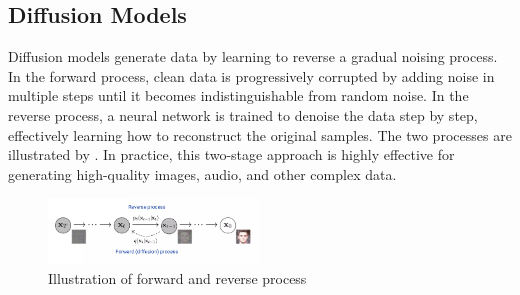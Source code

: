 \documentclass[a4paper,10pt]{article}
\begin{document}
\subsection{Diffusion Models}
Diffusion models generate data by learning to reverse a gradual noising process. In the forward process, clean data is progressively corrupted by adding noise in multiple steps until it becomes indistinguishable from random noise. In the reverse process, a neural network is trained to denoise the data step by step, effectively learning how to reconstruct the original samples. The two processes are illustrated by . In practice, this two-stage approach is highly effective for generating high-quality images, audio, and other complex data.
\begin{figure}[ht] %
    \centering
    \includegraphics[width=0.5\textwidth]{../images/Diffusion_model.png} %
    \caption{Illustration of forward and reverse process \cite{slideshare2025}}
    \label{fig:Diffusion_model}
\end{figure}
\end{document}
